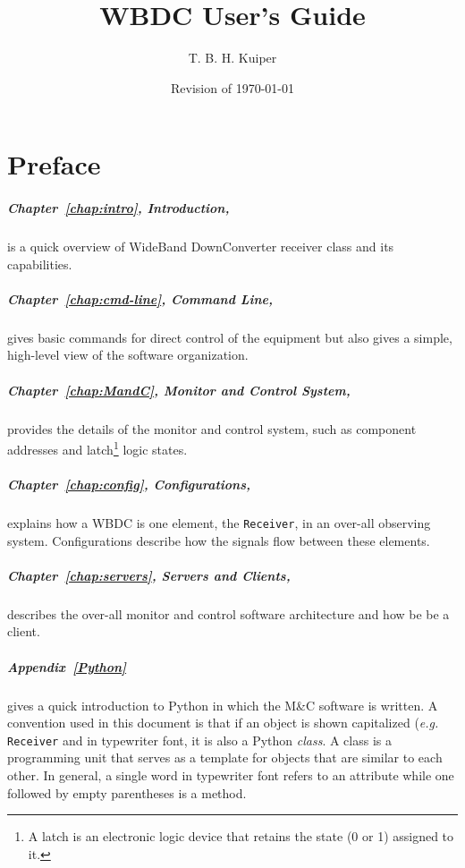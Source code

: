 \documentclass[letterpaper,11pt]{book}
\title{WBDC User's Guide}
\author{T. B. H. Kuiper}
\date{Revision of \today}
\begin{document}
\maketitle
\frontmatter
\chapter*{Preface}

\paragraph{Chapter~\ref{chap:intro}, Introduction,} is a quick overview of 
WideBand DownConverter receiver class and its capabilities.

\paragraph{Chapter~\ref{chap:cmd-line}, Command Line,} gives basic commands 
for direct 
control of the  equipment but also gives a simple, high-level view of the 
software organization.  

\paragraph{Chapter~\ref{chap:MandC}, Monitor and Control System,} provides the
details of the monitor and control system, such as component addresses and 
latch\footnote{A latch is an electronic logic device that retains the state
(0 or 1) assigned to it.} logic states.

\paragraph{Chapter~\ref{chap:config}, Configurations,} explains how a WBDC is 
one element,
the {\tt Receiver}, in an over-all observing system.  Configurations describe 
how the signals flow between these elements.

\paragraph{Chapter~\ref{chap:servers}, Servers and Clients,} describes the
over-all monitor and control software architecture and how be be a client.

\paragraph{Appendix~\ref{Python}} gives a quick introduction to Python in 
which the M\&C software is written. A convention used in this document is that 
if an object 
is shown capitalized ({\it e.g.} {\tt Receiver} and in typewriter font, it is
also a Python {\it class}. A class is a programming unit that serves as a 
template for objects that are similar to each other.  In general,
a single word in typewriter font refers to an attribute while one followed by
empty parentheses is a method.
\end{document}
